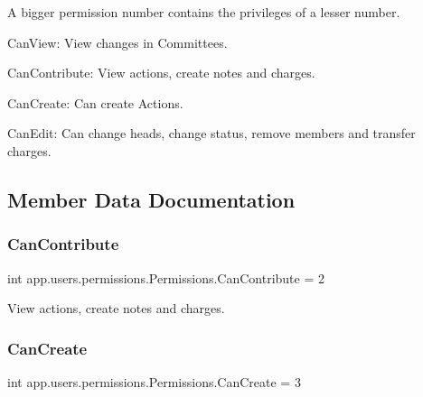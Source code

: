 A bigger permission number contains the privileges of a lesser number.


\begin{DoxyItemize}
\item Can\+View\+: View changes in Committees.
\item Can\+Contribute\+: View actions, create notes and charges.
\item Can\+Create\+: Can create Actions.
\item Can\+Edit\+: Can change heads, change status, remove members and transfer charges. 
\end{DoxyItemize}

\subsection{Member Data Documentation}
\mbox{\label{classapp_1_1users_1_1permissions_1_1_permissions_a473f3e4b52e00caaac924ebe2967f398}} 
\subsubsection{\texorpdfstring{Can\+Contribute}{CanContribute}}
{\footnotesize\ttfamily int app.\+users.\+permissions.\+Permissions.\+Can\+Contribute = 2\hspace{0.3cm}{\ttfamily [static]}}



View actions, create notes and charges. 

\mbox{\label{classapp_1_1users_1_1permissions_1_1_permissions_aabbe27ce336c3209218a350fd4a46425}} 
\subsubsection{\texorpdfstring{Can\+Create}{CanCreate}}
{\footnotesize\ttfamily int app.\+users.\+permissions.\+Permissions.\+Can\+Create = 3\hspace{0.3cm}{\ttfamily [static]}}



